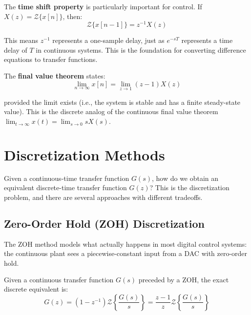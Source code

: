 The \textbf{time shift property} is particularly important for control. If $X(z) = \mathcal{Z}\{x[n]\}$, then:
\begin{equation}
\mathcal{Z}\{x[n-1]\} = z^{-1} X(z)
\end{equation}

This means $z^{-1}$ represents a one-sample delay, just as $e^{-sT}$ represents a time delay of $T$ in continuous systems. This is the foundation for converting difference equations to transfer functions.

The \textbf{final value theorem} states:
\begin{equation}
\lim_{n \to \infty} x[n] = \lim_{z \to 1} (z-1) X(z)
\end{equation}

provided the limit exists (i.e., the system is stable and has a finite steady-state value). This is the discrete analog of the continuous final value theorem $\lim_{t \to \infty} x(t) = \lim_{s \to 0} s X(s)$.


\section{Discretization Methods}
\label{sec:discretization}

Given a continuous-time transfer function $G(s)$, how do we obtain an equivalent discrete-time transfer function $G(z)$? This is the discretization problem, and there are several approaches with different tradeoffs.

\subsection{Zero-Order Hold (ZOH) Discretization}

The ZOH method models what actually happens in most digital control systems: the continuous plant sees a piecewise-constant input from a DAC with zero-order hold.

Given a continuous transfer function $G(s)$ preceded by a ZOH, the exact discrete equivalent is:
\begin{equation}
\boxed{G(z) = (1 - z^{-1}) \mathcal{Z}\left\{\frac{G(s)}{s}\right\} = \frac{z-1}{z} \mathcal{Z}\left\{\frac{G(s)}{s}\right\}}
\label{eq:zoh_discretization}
\end{equation}

